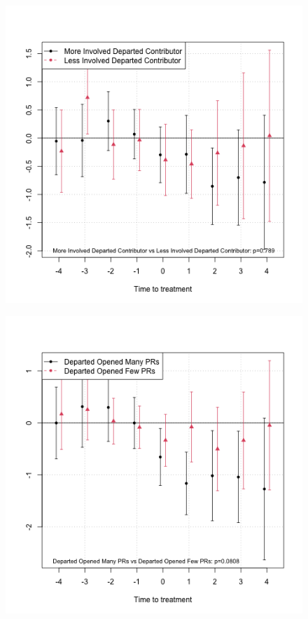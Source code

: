 \begin{figure}[htbp]
    \centering
    \begin{minipage}[b]{0.32\textwidth}
        \centering
        \includegraphics[width=\textwidth]{temp/output/collab/prs_opened_involved_cs_norm.png}
    \label{fig:prs_opened_involved}
    \end{minipage}
    \hfill
    \begin{minipage}[b]{0.32\textwidth}
        \centering
        \includegraphics[width=\textwidth]{temp/output/collab/prs_opened_departed_opened_cs_norm.png}

\end{minipage}
\end{figure}
